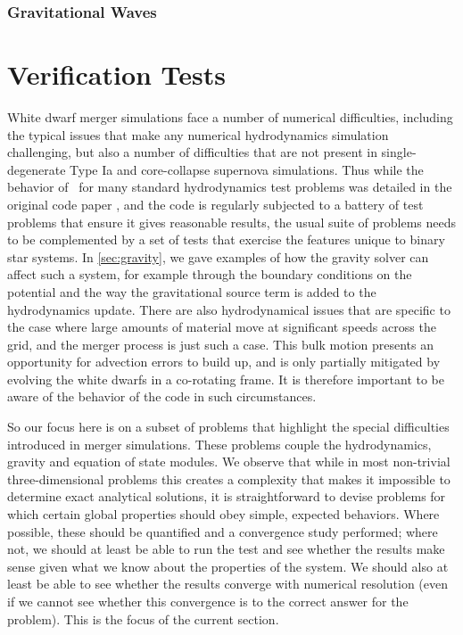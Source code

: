 \documentclass[12pt]{article}
\begin{document}
\subsubsection{Gravitational Waves}
\label{sec:grvatational_waves}



\newpage
\section{Verification Tests}
\label{sec:verification}

White dwarf merger simulations face a number of numerical difficulties,
including the typical issues that make any numerical hydrodynamics simulation
challenging, but also a number of difficulties that are
not present in single-degenerate Type Ia and core-collapse supernova
simulations.  Thus while the behavior of \castro\ for many standard hydrodynamics
test problems was detailed in the original code paper \citep{castro}, and the code
is regularly subjected to a battery of test problems that ensure it gives reasonable
results, the usual suite of problems needs to be complemented by a set of tests
that exercise the features unique to binary star systems. In \autoref{sec:gravity},
we gave examples of how the gravity solver can affect such a system, for example
through the boundary conditions on the potential and the way the gravitational source
term is added to the hydrodynamics update. There are also hydrodynamical issues that
are specific to the case where large amounts of material move at significant speeds
across the grid, and the merger process is just such a case. This bulk motion presents
an opportunity for advection errors to build up, and is only partially mitigated by
evolving the white dwarfs in a co-rotating frame. It is therefore important to be
aware of the behavior of the code in such circumstances.

So our focus here is on a subset of problems that highlight the special difficulties
introduced in merger simulations. These problems couple the hydrodynamics, gravity and
equation of state modules. We observe that while in most non-trivial
three-dimensional problems this creates a complexity that makes it
impossible to determine exact analytical solutions, it is
straightforward to devise problems for which certain global properties
should obey simple, expected behaviors. Where possible, these should
be quantified and a convergence study performed; where not, we should at least
be able to run the test and see whether the results make sense given what
we know about the properties of the system. We should also at least be able
to see whether the results converge with numerical resolution (even if we cannot
see whether this convergence is to the correct answer for the problem).
This is the focus of the current section.
\end{document}
